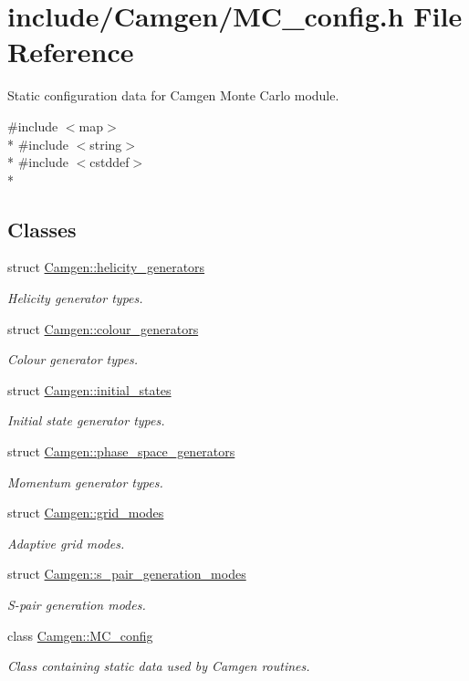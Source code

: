 \hypertarget{a00690}{}\section{include/\+Camgen/\+M\+C\+\_\+config.h File Reference}
\label{a00690}


Static configuration data for Camgen Monte Carlo module.  


{\ttfamily \#include $<$map$>$}\\*
{\ttfamily \#include $<$string$>$}\\*
{\ttfamily \#include $<$cstddef$>$}\\*
\subsection*{Classes}
\begin{DoxyCompactItemize}
\item 
struct \hyperlink{a00274}{Camgen\+::helicity\+\_\+generators}
\begin{DoxyCompactList}\small\item\em Helicity generator types. \end{DoxyCompactList}\item 
struct \hyperlink{a00083}{Camgen\+::colour\+\_\+generators}
\begin{DoxyCompactList}\small\item\em Colour generator types. \end{DoxyCompactList}\item 
struct \hyperlink{a00312}{Camgen\+::initial\+\_\+states}
\begin{DoxyCompactList}\small\item\em Initial state generator types. \end{DoxyCompactList}\item 
struct \hyperlink{a00423}{Camgen\+::phase\+\_\+space\+\_\+generators}
\begin{DoxyCompactList}\small\item\em Momentum generator types. \end{DoxyCompactList}\item 
struct \hyperlink{a00255}{Camgen\+::grid\+\_\+modes}
\begin{DoxyCompactList}\small\item\em Adaptive grid modes. \end{DoxyCompactList}\item 
struct \hyperlink{a00494}{Camgen\+::s\+\_\+pair\+\_\+generation\+\_\+modes}
\begin{DoxyCompactList}\small\item\em S-\/pair generation modes. \end{DoxyCompactList}\item 
class \hyperlink{a00365}{Camgen\+::\+M\+C\+\_\+config}
\begin{DoxyCompactList}\small\item\em Class containing static data used by Camgen routines. \end{DoxyCompactList}\end{DoxyCompactItemize}
